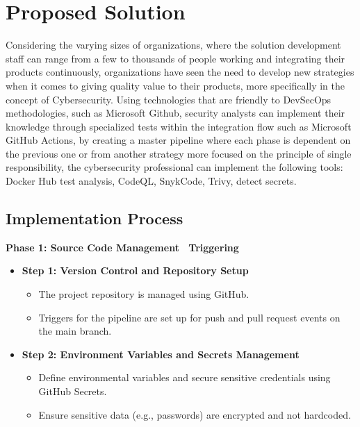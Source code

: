 \documentclass[conference]{IEEEtran}
\begin{document}
\section{Proposed Solution}
Considering the varying sizes of organizations, where the solution development staff can range from a few to thousands of people working and integrating their products continuously, organizations have seen the need to develop new strategies when it comes to giving quality value to their products, more specifically in the concept of Cybersecurity.
Using technologies that are friendly to DevSecOps methodologies, such as Microsoft Github, security analysts can implement their knowledge through specialized tests within the integration flow such as Microsoft GitHub Actions, by creating a master pipeline where each phase is dependent on the previous one or from another strategy more focused on the principle of single responsibility, the cybersecurity professional can implement the following tools: Docker Hub test analysis, CodeQL, SnykCode, Trivy, detect secrets.

\subsection{Implementation Process}

\textbf{Phase 1: Source Code Management \ Triggering}
\begin{itemize}
\item \textbf{Step 1: Version Control and Repository Setup}
\begin{itemize}
\item The project repository is managed using GitHub.
\item Triggers for the pipeline are set up for push and pull request events on the main branch.
\end{itemize}
\item \textbf{Step 2: Environment Variables and Secrets Management}
\begin{itemize}
\item Define environmental variables and secure sensitive credentials using GitHub Secrets.
\item Ensure sensitive data (e.g., passwords) are encrypted and not hardcoded.
\end{itemize}
\end{itemize}
\end{document}
